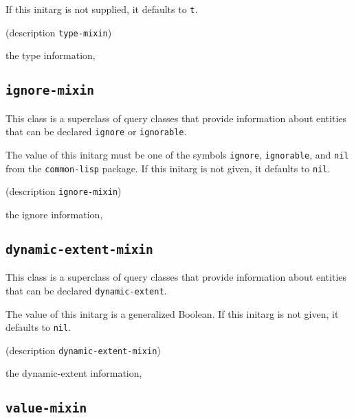 If this initarg is not supplied, it defaults to \texttt{t}.

{\footnotesize
{} {(description {\tt type-mixin})}
}

 the type information, 

\subsection{\texttt{ignore-mixin}}
\label{sec-ignore-mixin}

{\footnotesize
{}
}

This class is a superclass of query classes that provide information
about entities that can be declared \texttt{ignore} or \texttt{ignorable}.

{\footnotesize
{}
}

The value of this initarg must be one of the symbols \texttt{ignore},
\texttt{ignorable}, and \texttt{nil} from the \texttt{common-lisp}
package.  If this initarg is not given, it defaults to \texttt{nil}.

{\footnotesize
{} {(description {\tt ignore-mixin})}
}

 the ignore information, 

\subsection{\texttt{dynamic-extent-mixin}}
\label{sec-dynamic-extent-mixin}

{\footnotesize
{}
}

This class is a superclass of query classes that provide information
about entities that can be declared \texttt{dynamic-extent}.

{\footnotesize
{}
}

The value of this initarg is a generalized Boolean.  If this initarg
is not given, it defaults to \texttt{nil}.

{\footnotesize
{} {(description {\tt dynamic-extent-mixin})}
}

 the dynamic-extent information, 

\subsection{\texttt{value-mixin}}
\label{sec-value-mixin}

